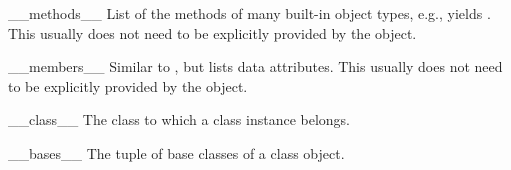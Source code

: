 \begin{memberdesc}[object]{__methods__}
List of the methods of many built-in object types,
e.g.,  yields
.  This usually does not need to be explicitly
provided by the object.
\end{memberdesc}

\begin{memberdesc}[object]{__members__}
Similar to , but lists data attributes.  This
usually does not need to be explicitly provided by the object.
\end{memberdesc}

\begin{memberdesc}[instance]{__class__}
The class to which a class instance belongs.
\end{memberdesc}

\begin{memberdesc}[class]{__bases__}
The tuple of base classes of a class object.
\end{memberdesc}
